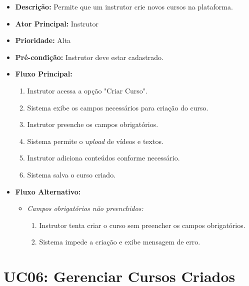         \begin{itemize}
            \item \textbf{Descrição:} Permite que um instrutor crie novos cursos na plataforma.
            
            \item \textbf{Ator Principal:} Instrutor
            
            \item \textbf{Prioridade:} Alta
            
            \item \textbf{Pré-condição:} Instrutor deve estar cadastrado.
            
            \item \textbf{Fluxo Principal:}
            \begin{enumerate}
                \item Instrutor acessa a opção "Criar Curso".
                \item Sistema exibe os campos necessários para criação do curso.
                \item Instrutor preenche os campos obrigatórios.
                \item Sistema permite o \textit{upload} de vídeos e textos.
                \item Instrutor adiciona conteúdos conforme necessário.
                \item Sistema salva o curso criado.
            \end{enumerate}

            \item \textbf{Fluxo Alternativo:}
            \begin{itemize}
                \item \textit{Campos obrigatórios não preenchidos:}
                \begin{enumerate}
                    \item Instrutor tenta criar o curso sem preencher os campos obrigatórios.
                    \item Sistema impede a criação e exibe mensagem de erro.
                \end{enumerate}
            \end{itemize}
        \end{itemize}

        \section*{UC06: Gerenciar Cursos Criados}

